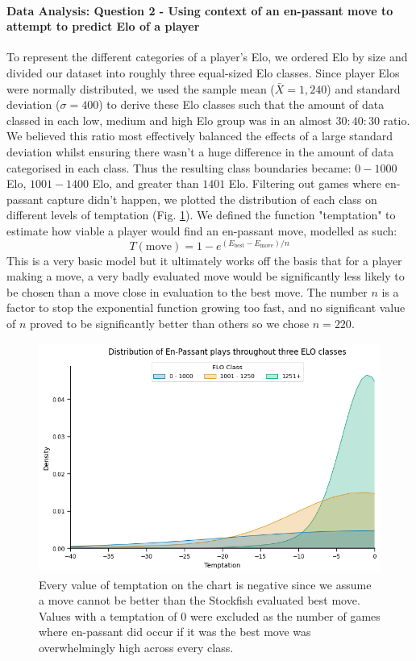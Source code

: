 \documentclass[10pt,a4paper]{article}
\begin{document}
\begin{multicols}{2}
\paragraph{Data Analysis: Question 2 - Using context of an en-passant move to attempt to predict Elo of a player}
To represent the different categories of a player's Elo, we ordered Elo by size and divided our dataset into roughly three equal-sized Elo classes. Since player Elos were normally distributed, we used the sample mean ($\bar{X} = 1,240$) and standard deviation ($\sigma = 400$) to derive these Elo classes such that the amount of data classed in each low, medium and high Elo group was in an almost $30:40:30$ ratio. We believed this ratio most effectively balanced the effects of a large standard deviation whilst ensuring there wasn't a huge difference in the amount of data categorised in each class.
Thus the resulting class boundaries became: $0 - 1000$ Elo, $1001 - 1400$ Elo, and greater than $1401$ Elo. Filtering out games where en-passant capture didn't happen, we plotted the distribution of each class on different levels of temptation (Fig. \ref{fds-project-template:fig:ep_distplot}). We defined the function "temptation" to estimate how viable a player would find an en-passant move, modelled as such:
$$T(\text{move})= 1 -e^{(E_{\text{best}} - E_{\text{move}})/{n}}$$
This is a very basic model but it ultimately works off the basis that for a player making a move, a very badly evaluated move would be significantly less likely to be chosen than a move close in evaluation to the best move. The number $n$ is a factor to stop the exponential function growing too fast, and no significant value of $n$ proved to be significantly better than others so we chose $n=220$.\newline

\begin{figure}[t]
  \centering
  \includegraphics[width=\textwidth]{report/images/ep_distplot.png}
  \caption{Every value of temptation on the chart is negative since we assume a move cannot be better than the Stockfish evaluated best move. Values with a temptation of $0$ were excluded as the number of games where en-passant did occur if it was the best move was overwhelmingly high across every class.}
  \label{fds-project-template:fig:ep_distplot}
\end{figure}


\end{multicols}
\end{document}
